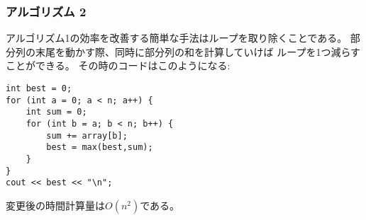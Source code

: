\begin{comment}
\subsubsection{Algorithm 2}

It is easy to make Algorithm 1 more efficient
by removing one loop from it.
This is possible by calculating the sum at the same
time when the right end of the subarray moves.
The result is the following code:

\begin{lstlisting}
int best = 0;
for (int a = 0; a < n; a++) {
    int sum = 0;
    for (int b = a; b < n; b++) {
        sum += array[b];
        best = max(best,sum);
    }
}
cout << best << "\n";
\end{lstlisting}
\end{comment}

\subsubsection{アルゴリズム 2}

アルゴリズム1の効率を改善する簡単な手法はループを取り除くことである。
部分列の末尾を動かす際、同時に部分列の和を計算していけば
ループを1つ減らすことができる。
その時のコードはこのようになる:

\begin{lstlisting}
int best = 0;
for (int a = 0; a < n; a++) {
    int sum = 0;
    for (int b = a; b < n; b++) {
        sum += array[b];
        best = max(best,sum);
    }
}
cout << best << "\n";
\end{lstlisting}

\begin{comment}
After this change, the time complexity is $O(n^2)$.
\end{comment}

変更後の時間計算量は$O(n^2)$である。

\begin{comment}
\subsubsection{Algorithm 3}

Surprisingly, it is possible to solve the problem
in $O(n)$ time\footnote{In \cite{ben86}, this linear-time algorithm
is attributed to J. B. Kadane, and the algorithm is sometimes
called \index{Kadane's algorithm} \key{Kadane's algorithm}.}, which means
that just one loop is enough.
The idea is to calculate, for each array position,
the maximum sum of a subarray that ends at that position.
After this, the answer for the problem is the
maximum of those sums.

Consider the subproblem of finding the maximum-sum subarray
that ends at position $k$.
There are two possibilities:
\begin{enumerate}
\item The subarray only contains the element at position $k$.
\item The subarray consists of a subarray that ends
at position $k-1$, followed by the element at position $k$.
\end{enumerate}
\end{comment}

